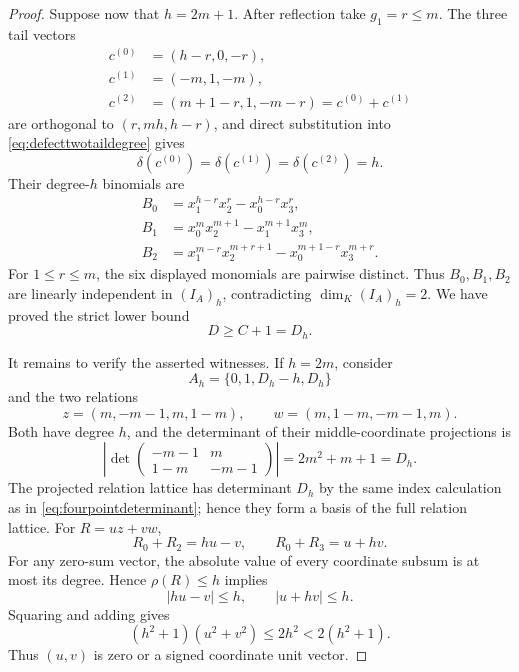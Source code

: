 \documentclass[11pt,reqno]{amsart}
\theoremstyle{definition}
\theoremstyle{remark}
\begin{document}
\begin{proof}
Suppose now that $h=2m+1$.  After reflection take $g_1=r\leq m$.
The three tail vectors
\[
 \begin{aligned}
 c^{(0)}&=(h-r,0,-r),\\
 c^{(1)}&=(-m,1,-m),\\
 c^{(2)}&=(m+1-r,1,-m-r)=c^{(0)}+c^{(1)}
 \end{aligned}
\]
are orthogonal to $(r,mh,h-r)$, and direct substitution into
\eqref{eq:defecttwotaildegree} gives
\[
 \delta(c^{(0)})=\delta(c^{(1)})=\delta(c^{(2)})=h.
\]
Their degree-$h$ binomials are
\[
 \begin{aligned}
 B_0&=x_1^{h-r}x_2^r-x_0^{h-r}x_3^r,\\
 B_1&=x_0^m x_2^{m+1}-x_1^{m+1}x_3^m,\\
 B_2&=x_1^{m-r}x_2^{m+r+1}
      -x_0^{m+1-r}x_3^{m+r}.
 \end{aligned}
\]
For $1\leq r\leq m$, the six displayed monomials are pairwise distinct.
Thus $B_0,B_1,B_2$ are linearly independent in $(I_A)_h$, contradicting
$\dim_K(I_A)_h=2$.  We have proved the strict lower bound
\begin{equation}\label{eq:defecttwolower}
 D\geq C+1=D_h.
\end{equation}

It remains to verify the asserted witnesses.  If $h=2m$, consider
\[
 A_h=\{0,1,D_h-h,D_h\}
\]
and the two relations
\[
 z=(m,-m-1,m,1-m),\qquad
 w=(m,1-m,-m-1,m).
\]
Both have degree $h$, and the determinant of their middle-coordinate
projections is
\[
 \left|\det
 \begin{pmatrix}
  -m-1&m\\
  1-m&-m-1
 \end{pmatrix}\right|=2m^2+m+1=D_h.
\]
The projected relation lattice has determinant $D_h$ by the same index
calculation as in \eqref{eq:fourpointdeterminant}; hence they form a basis of
the full relation lattice.  For $R=uz+vw$,
\[
 R_0+R_2=hu-v,\qquad R_0+R_3=u+hv.
\]
For any zero-sum vector, the absolute value of every coordinate subsum is
at most its degree.  Hence $\rho(R)\leq h$ implies
\[
 |hu-v|\leq h,\qquad |u+hv|\leq h.
\]
Squaring and adding gives
\[
 (h^2+1)(u^2+v^2)\leq2h^2<2(h^2+1).
\]
Thus $(u,v)$ is zero or a signed coordinate unit vector.


\end{proof}
\end{document}
